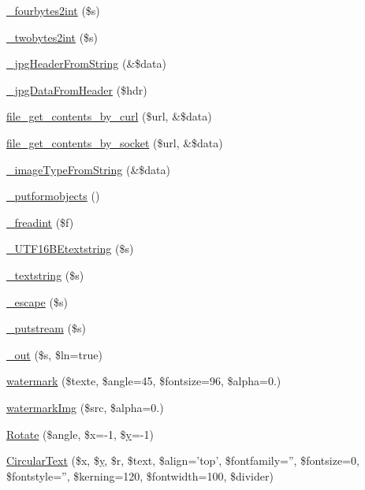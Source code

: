 \begin{DoxyCompactItemize}
\hyperlink{classm_p_d_f_aab43fa64eff61b13fe143309ed4cf22b}{\-\_\-fourbytes2int} (\$s)
\item 
\hyperlink{classm_p_d_f_adf396d07bc9311b3127e96fae0b34ef3}{\-\_\-twobytes2int} (\$s)
\item 
\hyperlink{classm_p_d_f_a5e77dddaa712ceed2e112477c93efec8}{\-\_\-jpg\-Header\-From\-String} (\&\$data)
\item 
\hyperlink{classm_p_d_f_a7efb70a0005369da432af725f71f0f29}{\-\_\-jpg\-Data\-From\-Header} (\$hdr)
\item 
\hyperlink{classm_p_d_f_a2253c132dda61b070ee4a36898b88241}{file\-\_\-get\-\_\-contents\-\_\-by\-\_\-curl} (\$url, \&\$data)
\item 
\hyperlink{classm_p_d_f_a38bafa7ee438335af83e31c371906165}{file\-\_\-get\-\_\-contents\-\_\-by\-\_\-socket} (\$url, \&\$data)
\item 
\hyperlink{classm_p_d_f_af64cb974785959f32563c331bcc854aa}{\-\_\-image\-Type\-From\-String} (\&\$data)
\item 
\hyperlink{classm_p_d_f_aeb88f370763bb93ff7835032b6f2a2e2}{\-\_\-putformobjects} ()
\item 
\hyperlink{classm_p_d_f_a832a8e14462c40c223a72940d9dc5ad1}{\-\_\-freadint} (\$f)
\item 
\hyperlink{classm_p_d_f_a0a38c92ece832b1dd08e2472af207012}{\-\_\-\-U\-T\-F16\-B\-Etextstring} (\$s)
\item 
\hyperlink{classm_p_d_f_aab773b563b19b7084e915bb852bd2c04}{\-\_\-textstring} (\$s)
\item 
\hyperlink{classm_p_d_f_a2a9cc37b27bcd8d40f3a8edfc8dd5ded}{\-\_\-escape} (\$s)
\item 
\hyperlink{classm_p_d_f_a231b49f0f380dd6bb8ee2a27ccccbca6}{\-\_\-putstream} (\$s)
\item 
\hyperlink{classm_p_d_f_ab6302579b26281fdbb6faeffc84e6239}{\-\_\-out} (\$s, \$ln=true)
\item 
\hyperlink{classm_p_d_f_a4edd585f56deb65ec42662b866e8962d}{watermark} (\$texte, \$angle=45, \$fontsize=96, \$alpha=0.)
\item 
\hyperlink{classm_p_d_f_a484fdb344f12188912ab06594b119bed}{watermark\-Img} (\$src, \$alpha=0.)
\item 
\hyperlink{classm_p_d_f_abbf9c68911fa87c516f9c3a517fdaa2b}{Rotate} (\$angle, \$x=-\/1, \$\hyperlink{example43___m_p_d_f_i__booklet_8php_a3f83be162d14f38451e1bc419fbbbcbc}{y}=-\/1)
\item 
\hyperlink{classm_p_d_f_ada8fc86e249fc9faddbaa146459842ff}{Circular\-Text} (\$x, \$\hyperlink{example43___m_p_d_f_i__booklet_8php_a3f83be162d14f38451e1bc419fbbbcbc}{y}, \$r, \$text, \$align='top', \$fontfamily='', \$fontsize=0, \$fontstyle='', \$kerning=120, \$fontwidth=100, \$divider)

\end{DoxyCompactItemize}
